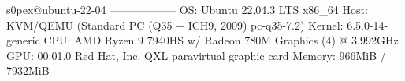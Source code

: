 s0pex@ubuntu-22-04 
------------------ 
OS: Ubuntu 22.04.3 LTS x86\_64 
Host: KVM/QEMU (Standard PC (Q35 + ICH9, 2009) pc-q35-7.2) 
Kernel: 6.5.0-14-generic 
CPU: AMD Ryzen 9 7940HS w/ Radeon 780M Graphics (4) @ 3.992GHz 
GPU: 00:01.0 Red Hat, Inc. QXL paravirtual graphic card 
Memory: 966MiB / 7932MiB 